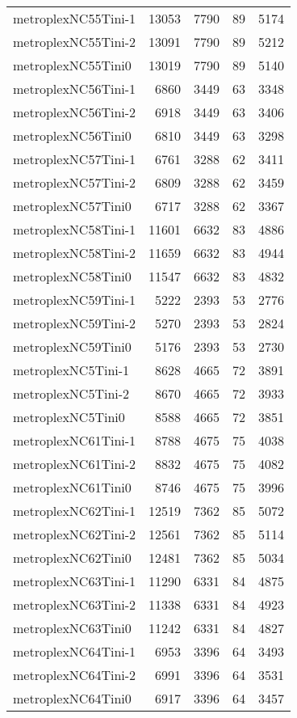 \begin{longtable}{lrrrr}
metroplexNC55Tini-1 & 13053 & 7790 & 89 & 5174 \\
metroplexNC55Tini-2 & 13091 & 7790 & 89 & 5212 \\
metroplexNC55Tini0 & 13019 & 7790 & 89 & 5140 \\
metroplexNC56Tini-1 & 6860 & 3449 & 63 & 3348 \\
metroplexNC56Tini-2 & 6918 & 3449 & 63 & 3406 \\
metroplexNC56Tini0 & 6810 & 3449 & 63 & 3298 \\
metroplexNC57Tini-1 & 6761 & 3288 & 62 & 3411 \\
metroplexNC57Tini-2 & 6809 & 3288 & 62 & 3459 \\
metroplexNC57Tini0 & 6717 & 3288 & 62 & 3367 \\
metroplexNC58Tini-1 & 11601 & 6632 & 83 & 4886 \\
metroplexNC58Tini-2 & 11659 & 6632 & 83 & 4944 \\
metroplexNC58Tini0 & 11547 & 6632 & 83 & 4832 \\
metroplexNC59Tini-1 & 5222 & 2393 & 53 & 2776 \\
metroplexNC59Tini-2 & 5270 & 2393 & 53 & 2824 \\
metroplexNC59Tini0 & 5176 & 2393 & 53 & 2730 \\
metroplexNC5Tini-1 & 8628 & 4665 & 72 & 3891 \\
metroplexNC5Tini-2 & 8670 & 4665 & 72 & 3933 \\
metroplexNC5Tini0 & 8588 & 4665 & 72 & 3851 \\
metroplexNC61Tini-1 & 8788 & 4675 & 75 & 4038 \\
metroplexNC61Tini-2 & 8832 & 4675 & 75 & 4082 \\
metroplexNC61Tini0 & 8746 & 4675 & 75 & 3996 \\
metroplexNC62Tini-1 & 12519 & 7362 & 85 & 5072 \\
metroplexNC62Tini-2 & 12561 & 7362 & 85 & 5114 \\
metroplexNC62Tini0 & 12481 & 7362 & 85 & 5034 \\
metroplexNC63Tini-1 & 11290 & 6331 & 84 & 4875 \\
metroplexNC63Tini-2 & 11338 & 6331 & 84 & 4923 \\
metroplexNC63Tini0 & 11242 & 6331 & 84 & 4827 \\
metroplexNC64Tini-1 & 6953 & 3396 & 64 & 3493 \\
metroplexNC64Tini-2 & 6991 & 3396 & 64 & 3531 \\
metroplexNC64Tini0 & 6917 & 3396 & 64 & 3457 \\

\end{longtable}
